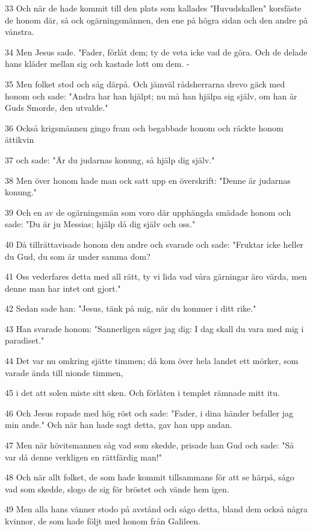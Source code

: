 \par 33 Och när de hade kommit till den plats som kallades "Huvudskallen" korsfäste de honom där, så ock ogärningsmännen, den ene på högra sidan och den andre på vänstra.
\par 34 Men Jesus sade. "Fader, förlåt dem; ty de veta icke vad de göra. Och de delade hans kläder mellan sig och kastade lott om dem. -
\par 35 Men folket stod och såg därpå. Och jämväl rådsherrarna drevo gäck med honom och sade: "Andra har han hjälpt; nu må han hjälpa sig själv, om han är Guds Smorde, den utvalde."
\par 36 Också krigsmännen gingo fram och begabbade honom och räckte honom ättikvin
\par 37 och sade: "Är du judarnas konung, så hjälp dig själv."
\par 38 Men över honom hade man ock satt upp en överskrift: "Denne är judarnas konung."
\par 39 Och en av de ogärningsmän som voro där upphängda smädade honom och sade: "Du är ju Messias; hjälp då dig själv och oss."
\par 40 Då tillrättavisade honom den andre och svarade och sade: "Fruktar icke heller du Gud, du som är under samma dom?
\par 41 Oss vederfares detta med all rätt, ty vi lida vad våra gärningar äro värda, men denne man har intet ont gjort."
\par 42 Sedan sade han: "Jesus, tänk på mig, när du kommer i ditt rike."
\par 43 Han svarade honom: "Sannerligen säger jag dig: I dag skall du vara med mig i paradiset."
\par 44 Det var nu omkring sjätte timmen; då kom över hela landet ett mörker, som varade ända till nionde timmen,
\par 45 i det att solen miste sitt sken. Och förlåten i templet rämnade mitt itu.
\par 46 Och Jesus ropade med hög röst och sade: "Fader, i dina händer befaller jag min ande." Och när han hade sagt detta, gav han upp andan.
\par 47 Men när hövitsmannen såg vad som skedde, prisade han Gud och sade: "Så var då denne verkligen en rättfärdig man!"
\par 48 Och när allt folket, de som hade kommit tillsammans för att se härpå, sågo vad som skedde, slogo de sig för bröstet och vände hem igen.
\par 49 Men alla hans vänner stodo på avstånd och sågo detta, bland dem också några kvinnor, de som hade följt med honom från Galileen.
